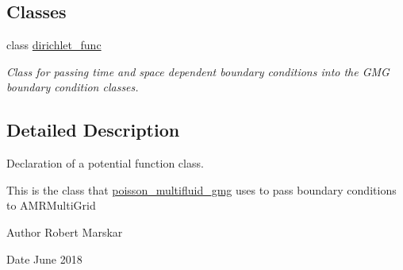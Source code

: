 \subsection*{Classes}
\begin{DoxyCompactItemize}
\item 
class \hyperlink{classdirichlet__func}{dirichlet\+\_\+func}
\begin{DoxyCompactList}\small\item\em Class for passing time and space dependent boundary conditions into the G\+MG boundary condition classes. \end{DoxyCompactList}\end{DoxyCompactItemize}


\subsection{Detailed Description}
Declaration of a potential function class. 

This is the class that \hyperlink{classpoisson__multifluid__gmg}{poisson\+\_\+multifluid\+\_\+gmg} uses to pass boundary conditions to A\+M\+R\+Multi\+Grid \begin{DoxyAuthor}{Author}
Robert Marskar 
\end{DoxyAuthor}
\begin{DoxyDate}{Date}
June 2018 
\end{DoxyDate}
